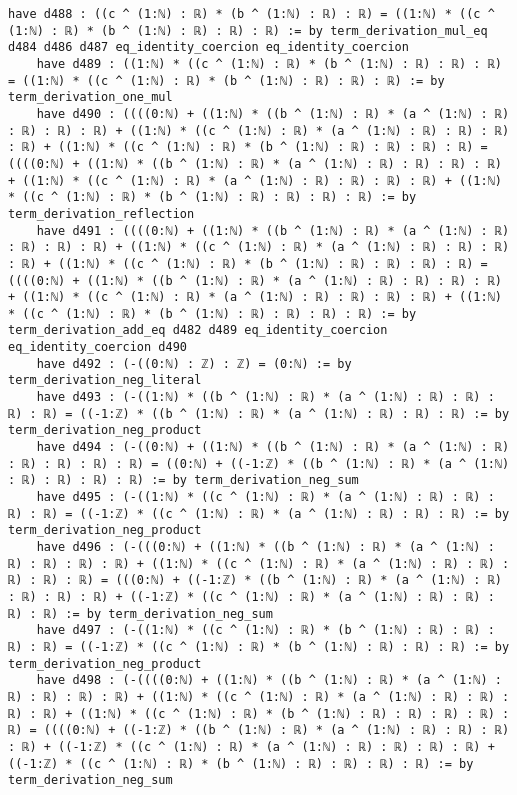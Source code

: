\documentclass{article}
\begin{document}
\begin{tcolorbox}[colback=white!10, width=\linewidth]
\begin{lstlisting}[language=Lean4]
    have d488 : ((c ^ (1:ℕ) : ℝ) * (b ^ (1:ℕ) : ℝ) : ℝ) = ((1:ℕ) * ((c ^ (1:ℕ) : ℝ) * (b ^ (1:ℕ) : ℝ) : ℝ) : ℝ) := by term_derivation_mul_eq d484 d486 d487 eq_identity_coercion eq_identity_coercion
    have d489 : ((1:ℕ) * ((c ^ (1:ℕ) : ℝ) * (b ^ (1:ℕ) : ℝ) : ℝ) : ℝ) = ((1:ℕ) * ((c ^ (1:ℕ) : ℝ) * (b ^ (1:ℕ) : ℝ) : ℝ) : ℝ) := by term_derivation_one_mul
    have d490 : ((((0:ℕ) + ((1:ℕ) * ((b ^ (1:ℕ) : ℝ) * (a ^ (1:ℕ) : ℝ) : ℝ) : ℝ) : ℝ) + ((1:ℕ) * ((c ^ (1:ℕ) : ℝ) * (a ^ (1:ℕ) : ℝ) : ℝ) : ℝ) : ℝ) + ((1:ℕ) * ((c ^ (1:ℕ) : ℝ) * (b ^ (1:ℕ) : ℝ) : ℝ) : ℝ) : ℝ) = ((((0:ℕ) + ((1:ℕ) * ((b ^ (1:ℕ) : ℝ) * (a ^ (1:ℕ) : ℝ) : ℝ) : ℝ) : ℝ) + ((1:ℕ) * ((c ^ (1:ℕ) : ℝ) * (a ^ (1:ℕ) : ℝ) : ℝ) : ℝ) : ℝ) + ((1:ℕ) * ((c ^ (1:ℕ) : ℝ) * (b ^ (1:ℕ) : ℝ) : ℝ) : ℝ) : ℝ) := by term_derivation_reflection
    have d491 : ((((0:ℕ) + ((1:ℕ) * ((b ^ (1:ℕ) : ℝ) * (a ^ (1:ℕ) : ℝ) : ℝ) : ℝ) : ℝ) + ((1:ℕ) * ((c ^ (1:ℕ) : ℝ) * (a ^ (1:ℕ) : ℝ) : ℝ) : ℝ) : ℝ) + ((1:ℕ) * ((c ^ (1:ℕ) : ℝ) * (b ^ (1:ℕ) : ℝ) : ℝ) : ℝ) : ℝ) = ((((0:ℕ) + ((1:ℕ) * ((b ^ (1:ℕ) : ℝ) * (a ^ (1:ℕ) : ℝ) : ℝ) : ℝ) : ℝ) + ((1:ℕ) * ((c ^ (1:ℕ) : ℝ) * (a ^ (1:ℕ) : ℝ) : ℝ) : ℝ) : ℝ) + ((1:ℕ) * ((c ^ (1:ℕ) : ℝ) * (b ^ (1:ℕ) : ℝ) : ℝ) : ℝ) : ℝ) := by term_derivation_add_eq d482 d489 eq_identity_coercion eq_identity_coercion d490
    have d492 : (-((0:ℕ) : ℤ) : ℤ) = (0:ℕ) := by term_derivation_neg_literal
    have d493 : (-((1:ℕ) * ((b ^ (1:ℕ) : ℝ) * (a ^ (1:ℕ) : ℝ) : ℝ) : ℝ) : ℝ) = ((-1:ℤ) * ((b ^ (1:ℕ) : ℝ) * (a ^ (1:ℕ) : ℝ) : ℝ) : ℝ) := by term_derivation_neg_product
    have d494 : (-((0:ℕ) + ((1:ℕ) * ((b ^ (1:ℕ) : ℝ) * (a ^ (1:ℕ) : ℝ) : ℝ) : ℝ) : ℝ) : ℝ) = ((0:ℕ) + ((-1:ℤ) * ((b ^ (1:ℕ) : ℝ) * (a ^ (1:ℕ) : ℝ) : ℝ) : ℝ) : ℝ) := by term_derivation_neg_sum
    have d495 : (-((1:ℕ) * ((c ^ (1:ℕ) : ℝ) * (a ^ (1:ℕ) : ℝ) : ℝ) : ℝ) : ℝ) = ((-1:ℤ) * ((c ^ (1:ℕ) : ℝ) * (a ^ (1:ℕ) : ℝ) : ℝ) : ℝ) := by term_derivation_neg_product
    have d496 : (-(((0:ℕ) + ((1:ℕ) * ((b ^ (1:ℕ) : ℝ) * (a ^ (1:ℕ) : ℝ) : ℝ) : ℝ) : ℝ) + ((1:ℕ) * ((c ^ (1:ℕ) : ℝ) * (a ^ (1:ℕ) : ℝ) : ℝ) : ℝ) : ℝ) : ℝ) = (((0:ℕ) + ((-1:ℤ) * ((b ^ (1:ℕ) : ℝ) * (a ^ (1:ℕ) : ℝ) : ℝ) : ℝ) : ℝ) + ((-1:ℤ) * ((c ^ (1:ℕ) : ℝ) * (a ^ (1:ℕ) : ℝ) : ℝ) : ℝ) : ℝ) := by term_derivation_neg_sum
    have d497 : (-((1:ℕ) * ((c ^ (1:ℕ) : ℝ) * (b ^ (1:ℕ) : ℝ) : ℝ) : ℝ) : ℝ) = ((-1:ℤ) * ((c ^ (1:ℕ) : ℝ) * (b ^ (1:ℕ) : ℝ) : ℝ) : ℝ) := by term_derivation_neg_product
    have d498 : (-((((0:ℕ) + ((1:ℕ) * ((b ^ (1:ℕ) : ℝ) * (a ^ (1:ℕ) : ℝ) : ℝ) : ℝ) : ℝ) + ((1:ℕ) * ((c ^ (1:ℕ) : ℝ) * (a ^ (1:ℕ) : ℝ) : ℝ) : ℝ) : ℝ) + ((1:ℕ) * ((c ^ (1:ℕ) : ℝ) * (b ^ (1:ℕ) : ℝ) : ℝ) : ℝ) : ℝ) : ℝ) = ((((0:ℕ) + ((-1:ℤ) * ((b ^ (1:ℕ) : ℝ) * (a ^ (1:ℕ) : ℝ) : ℝ) : ℝ) : ℝ) + ((-1:ℤ) * ((c ^ (1:ℕ) : ℝ) * (a ^ (1:ℕ) : ℝ) : ℝ) : ℝ) : ℝ) + ((-1:ℤ) * ((c ^ (1:ℕ) : ℝ) * (b ^ (1:ℕ) : ℝ) : ℝ) : ℝ) : ℝ) := by term_derivation_neg_sum

\end{lstlisting}
\end{tcolorbox}
\end{document}

